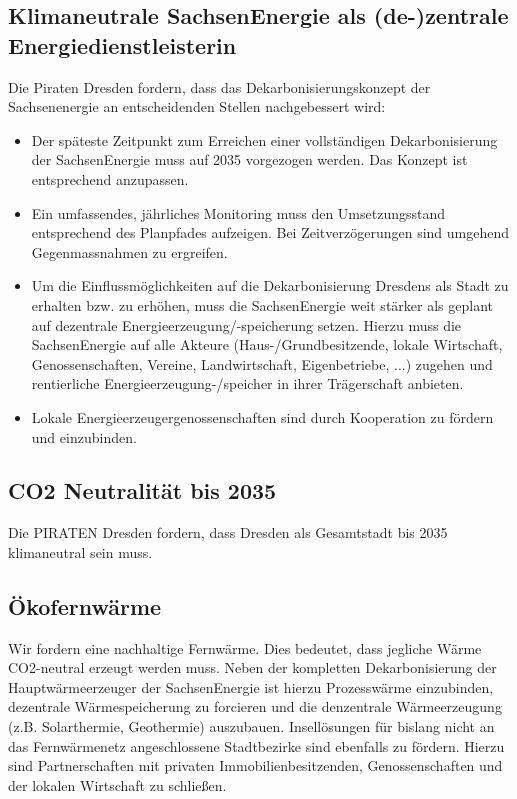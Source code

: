 \documentclass[a4paper, 11pt]{article}
\begin{document}
\subsection{Klimaneutrale SachsenEnergie als (de-)zentrale Energiedienstleisterin}
Die Piraten Dresden fordern, dass das Dekarbonisierungskonzept der Sachsenenergie an entscheidenden Stellen nachgebessert wird:

\begin{itemize}
    \item Der späteste Zeitpunkt zum Erreichen einer vollständigen Dekarbonisierung der SachsenEnergie muss auf 2035 vorgezogen werden. Das Konzept ist entsprechend anzupassen.
    \item Ein umfassendes, jährliches Monitoring muss den Umsetzungsstand entsprechend des Planpfades aufzeigen. Bei Zeitverzögerungen sind umgehend Gegenmassnahmen zu ergreifen.
    \item Um die Einflussmöglichkeiten auf die Dekarbonisierung Dresdens als Stadt zu erhalten bzw. zu erhöhen, muss die SachsenEnergie weit stärker als geplant auf dezentrale Energieerzeugung/-speicherung setzen. Hierzu muss die SachsenEnergie auf alle Akteure (Haus-/Grundbesitzende, lokale Wirtschaft, Genossenschaften, Vereine, Landwirtschaft, Eigenbetriebe, ...) zugehen und rentierliche Energieerzeugung-/speicher in ihrer Trägerschaft anbieten.
    \item Lokale Energieerzeugergenossenschaften sind durch Kooperation zu fördern und einzubinden.
\end{itemize}

\subsection{CO2 Neutralität bis 2035}
Die PIRATEN Dresden fordern, dass Dresden als Gesamtstadt bis 2035 klimaneutral sein muss.


\subsection{Ökofernwärme}
Wir fordern eine nachhaltige Fernwärme. Dies bedeutet, dass jegliche Wärme CO2-neutral erzeugt werden muss. Neben der kompletten Dekarbonisierung der Hauptwärmeerzeuger der SachsenEnergie ist hierzu Prozesswärme einzubinden, dezentrale Wärmespeicherung zu forcieren und die denzentrale Wärmeerzeugung (z.B. Solarthermie, Geothermie) auszubauen. Insellösungen für bislang nicht an das Fernwärmenetz angeschlossene Stadtbezirke sind ebenfalls zu fördern. Hierzu sind Partnerschaften mit privaten Immobilienbesitzenden, Genossenschaften und der lokalen Wirtschaft zu schließen.
\end{document}
